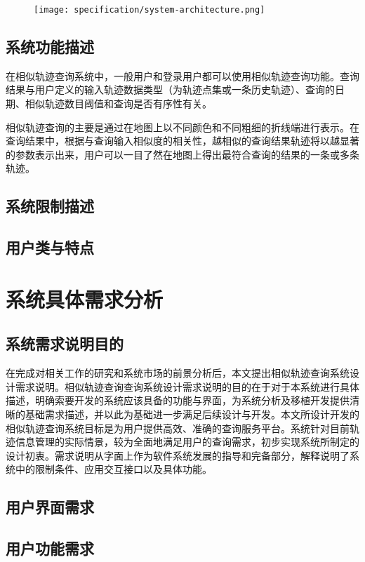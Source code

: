 \begin{figure}[!htp]
  \centering
  \texttt{[image: specification/system-architecture.png]}
\end{figure}

\subsection{系统功能描述}
\label{subsec:product functions}
在相似轨迹查询系统中，一般用户和登录用户都可以使用相似轨迹查询功能。查询结果与用户定义的输入轨迹数据类型（为轨迹点集或一条历史轨迹）、查询的日期、相似轨迹数目阈值和查询是否有序性有关。

相似轨迹查询的主要是通过在地图上以不同颜色和不同粗细的折线端进行表示。在查询结果中，根据与查询输入相似度的相关性，越相似的查询结果轨迹将以越显著的参数表示出来，用户可以一目了然在地图上得出最符合查询的结果的一条或多条轨迹。

\subsection{系统限制描述}

\subsection{用户类与特点}
\label{subsec:user characteristics}

\section{系统具体需求分析}
\label{sec:overall description}


\subsection{系统需求说明目的}
\label{subsec:propose}
在完成对相关工作的研究和系统市场的前景分析后，本文提出相似轨迹查询系统设计需求说明。相似轨迹查询查询系统设计需求说明的目的在于对于本系统进行具体描述，明确索要开发的系统应该具备的功能与界面，为系统分析及移植开发提供清晰的基础需求描述，并以此为基础进一步满足后续设计与开发。本文所设计开发的相似轨迹查询系统目标是为用户提供高效、准确的查询服务平台。系统针对目前轨迹信息管理的实际情景，较为全面地满足用户的查询需求，初步实现系统所制定的设计初衷。需求说明从字面上作为软件系统发展的指导和完备部分，解释说明了系统中的限制条件、应用交互接口以及具体功能。


\subsection{用户界面需求}
\label{subsec:external interface Requirements}

\subsection{用户功能需求}
\label{subsec:user class functional requirements}


